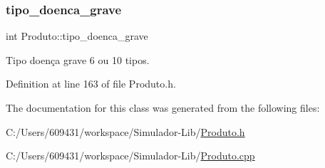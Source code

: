 \hypertarget{class_produto_a2b89a8682a290751479f50c4c1ea1fa5}{}\label{class_produto_a2b89a8682a290751479f50c4c1ea1fa5} 
\subsubsection{\texorpdfstring{tipo\+\_\+doenca\+\_\+grave}{tipo\_doenca\_grave}}
{\footnotesize\ttfamily int Produto\+::tipo\+\_\+doenca\+\_\+grave\hspace{0.3cm}{\ttfamily [private]}}

Tipo doença grave 6 ou 10 tipos. 

Definition at line 163 of file Produto.\+h.



The documentation for this class was generated from the following files\+:\begin{DoxyCompactItemize}
\item 
C\+:/\+Users/609431/workspace/\+Simulador-\/\+Lib/\hyperlink{_produto_8h}{Produto.\+h}\item 
C\+:/\+Users/609431/workspace/\+Simulador-\/\+Lib/\hyperlink{_produto_8cpp}{Produto.\+cpp}\end{DoxyCompactItemize}
